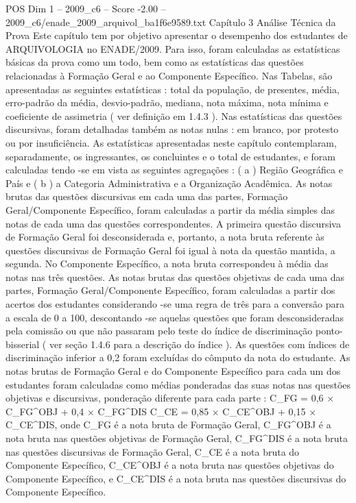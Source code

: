 \begin{textsample}{POS Dim 1 – 2009\_c6 – Score -2.00 – 2009\_c6/enade\_2009\_arquivol\_ba1f6e9589.txt}  \label{ex:f1_pos_226}
Capítulo 3 Análise Técnica da Prova Este capítulo tem por objetivo apresentar o desempenho dos estudantes de ARQUIVOLOGIA no ENADE/2009.
Para isso, foram calculadas as estatísticas básicas da prova como um todo, bem como as estatísticas das questões relacionadas à Formação Geral e ao Componente Específico.
Nas Tabelas, são apresentadas as seguintes estatísticas : total da população, de presentes, média, erro-padrão da média, desvio-padrão, mediana, nota máxima, nota mínima e coeficiente de assimetria ( ver definição em 1.4.3 ).
Nas estatísticas das questões discursivas, foram detalhadas também as notas nulas : em branco, por protesto ou por insuficiência.
As estatísticas apresentadas neste capítulo contemplaram, separadamente, os ingressantes, os concluintes e o total de estudantes, e foram calculadas tendo -se em vista as seguintes agregações : ( a ) Região Geográfica e País e ( b ) a Categoria Administrativa e a Organização Acadêmica.
As notas brutas das questões discursivas em cada uma das partes, Formação Geral/Componente Específico, foram calculadas a partir da média simples das notas de cada uma das questões correspondentes.
A primeira questão discursiva de Formação Geral foi desconsiderada e, portanto, a nota bruta referente às questões discursivas de Formação Geral foi igual à nota da questão mantida, a segunda.
No Componente Específico, a nota bruta correspondeu à média das notas nas três questões.
As notas brutas das questões objetivas de cada uma das partes, Formação Geral/Componente Específico, foram calculadas a partir dos acertos dos estudantes considerando -se uma regra de três para a conversão para a escala de 0 a 100, descontando -se aquelas questões que foram desconsideradas pela comissão ou que não passaram pelo teste do índice de discriminação ponto-bisserial ( ver seção 1.4.6 para a descrição do índice ).
As questões com índices de discriminação inferior a 0,2 foram excluídas do cômputo da nota do estudante.
As notas brutas de Formação Geral e do Componente Específico para cada um dos estudantes foram calculadas como médias ponderadas das suas notas nas questões objetivas e discursivas, ponderação diferente para cada parte : C\_FG = 0,6 × C\_FG\textasciicircum{}OBJ + 0,4 × C\_FG\textasciicircum{}DIS C\_CE = 0,85 × C\_CE\textasciicircum{}OBJ + 0,15 × C\_CE\textasciicircum{}DIS, onde C\_FG é a nota bruta de Formação Geral, C\_FG\textasciicircum{}OBJ é a nota bruta nas questões objetivas de Formação Geral, C\_FG\textasciicircum{}DIS é a nota bruta nas questões discursivas de Formação Geral, C\_CE é a nota bruta do Componente Específico, C\_CE\textasciicircum{}OBJ é a nota bruta nas questões objetivas do Componente Específico, e C\_CE\textasciicircum{}DIS é a nota bruta nas questões discursivas do Componente Específico.

\end{textsample}
